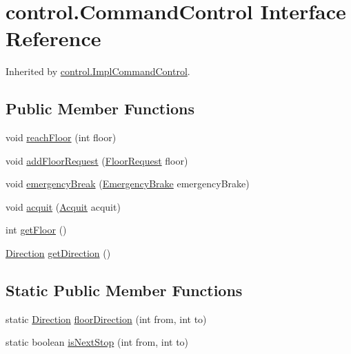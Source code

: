 \hypertarget{interfacecontrol_1_1_command_control}{}\section{control.\+Command\+Control Interface Reference}
\label{interfacecontrol_1_1_command_control}


Inherited by \mbox{\hyperlink{classcontrol_1_1_impl_command_control}{control.\+Impl\+Command\+Control}}.

\subsection*{Public Member Functions}
\begin{DoxyCompactItemize}
\item 
void \mbox{\hyperlink{interfacecontrol_1_1_command_control_aed88af210353f0e854d6da8af1089851}{reach\+Floor}} (int floor)
\item 
void \mbox{\hyperlink{interfacecontrol_1_1_command_control_addb1fea724cbd015456ac62a1dcf556d}{add\+Floor\+Request}} (\mbox{\hyperlink{classcontrol_1_1command_1_1_floor_request}{Floor\+Request}} floor)
\item 
void \mbox{\hyperlink{interfacecontrol_1_1_command_control_a9a32457770712105c8ceffab1c05b95a}{emergency\+Break}} (\mbox{\hyperlink{classcontrol_1_1command_1_1_emergency_brake}{Emergency\+Brake}} emergency\+Brake)
\item 
void \mbox{\hyperlink{interfacecontrol_1_1_command_control_a7eb9b7d638a4680fdf89453ca16a6c93}{acquit}} (\mbox{\hyperlink{classcontrol_1_1command_1_1_acquit}{Acquit}} acquit)
\item 
int \mbox{\hyperlink{interfacecontrol_1_1_command_control_abfefcf986aceb87768275e04df3653f5}{get\+Floor}} ()
\item 
\mbox{\hyperlink{enumcontrol_1_1command_1_1_direction}{Direction}} \mbox{\hyperlink{interfacecontrol_1_1_command_control_af668873aadd297c71867fa707b5ecd55}{get\+Direction}} ()
\end{DoxyCompactItemize}
\subsection*{Static Public Member Functions}
\begin{DoxyCompactItemize}
\item 
static \mbox{\hyperlink{enumcontrol_1_1command_1_1_direction}{Direction}} \mbox{\hyperlink{interfacecontrol_1_1_command_control_a22ab7945cd82bb103b59e5d3103288a3}{floor\+Direction}} (int from, int to)
\item 
static boolean \mbox{\hyperlink{interfacecontrol_1_1_command_control_a4b2de21fece2328d079558688927fad2}{is\+Next\+Stop}} (int from, int to)
\end{DoxyCompactItemize}



